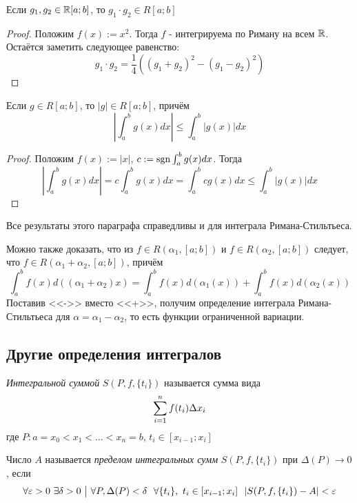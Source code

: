\begin{corollary}
	Если $g_1, g_2 \in \mathbb{R}[a; b]$, то $g_1 \cdot g_2 \in R[a; b]$
\end{corollary}

\begin{proof}
	Положим $f(x) := x^2$. Тогда $f$ - интегрируема по Риману на всем $\mathbb{R}$. Остаётся заметить следующее равенство:
	\[
		g_1 \cdot g_2 = \frac{1}{4}((g_1 + g_2)^2 - (g_1 - g_2)^2)
	\]
\end{proof}

\begin{corollary}
	Если $g \in R[a; b]$, то $|g| \in R[a; b]$, причём
	\[
		\left|\int_a^b g(x)dx\right| \le \int_a^b |g(x)|dx
	\]
\end{corollary}

\begin{proof}
	Положим $f(x) := |x|$, $c := \operatorname{sgn} \int_a^b g(x)dx$. Тогда
	\[
		\left|\int_a^b g(x)dx\right| = c\int_a^b g(x)dx = \int_a^b cg(x)dx \le \int_a^b |g(x)|dx
	\]
\end{proof}

\begin{note}
	Все результаты этого параграфа справедливы и для интеграла Римана-Стильтьеса.
\end{note}

\begin{note}
	Можно также доказать, что из $f \in R(\alpha_1, [a; b])$ и $f \in R(\alpha_2, [a; b])$ следует, что $f \in R(\alpha_1 + \alpha_2, [a; b])$, причём
	\[
		\int_a^b f(x) d((\alpha_1 + \alpha_2)x) = \int_a^b f(x) d(\alpha_1(x)) + \int_a^b f(x)d(\alpha_2(x))
	\]
	Поставив <<->> вместо <<+>>, получим определение интеграла Римана-Стильтьеса для $\alpha = \alpha_1 - \alpha_2$, то есть функции ограниченной вариации.
\end{note}

\subsection{Другие определения интегралов}

\begin{definition}
	\textit{Интегральной суммой} $S(P, f, \{t_i\})$ называется сумма вида
	\[
		\sum\limits_{i = 1}^n f(t_i) \Delta x_i
	\]
	где $P: a = x_0 < x_1 < \ldots < x_n = b$, $t_i \in [x_{i - 1}; x_i]$
\end{definition}

\begin{definition}
	Число $A$ называется \textit{пределом интегральных сумм} $S(P, f, \{t_i\})$ при $\Delta(P) \to 0$, если
	\[
		\forall \varepsilon > 0\ \exists \delta > 0 \ \big|\  \forall P, \Delta(P) < \delta\ \ \forall \{t_i\},\ t_i \in [x_{i - 1}; x_i]\ \ |S(P, f, \{t_i\}) - A| < \varepsilon
	\]
\end{definition}

